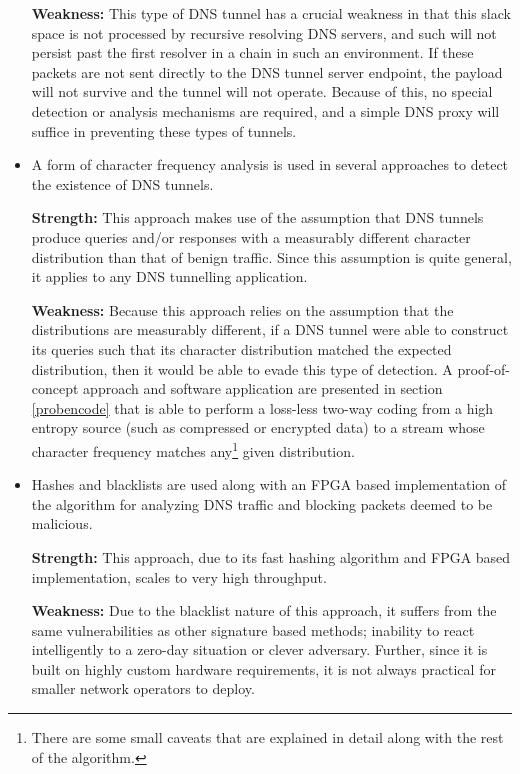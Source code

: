 \documentclass[12pt]{report}
\theoremstyle{remark}
\theoremstyle{definition}
\theoremstyle{definition}
\theoremstyle{definition}
\begin{document}
\begin{itemize}
\textbf{Weakness:} This type of DNS tunnel has a crucial weakness in that this
slack space is not processed by recursive resolving DNS servers, and such will
not persist past the first resolver in a chain in such an environment. If these
packets are not sent directly to the DNS tunnel server endpoint, the payload
will not survive and the tunnel will not operate. Because of this, no special
detection or analysis mechanisms are required, and a simple DNS proxy will
suffice in preventing these types of tunnels.

\item A form of character frequency analysis is used in several approaches to
detect the existence of DNS tunnels.

\textbf{Strength:} This approach makes use of the assumption that DNS tunnels
produce queries and/or responses with a measurably different character
distribution than that of benign traffic. Since this assumption is quite
general, it applies to any DNS tunnelling application.

\textbf{Weakness:} Because this approach relies on the assumption that the
distributions are measurably different, if a DNS tunnel were able to construct
its queries such that its character distribution matched the expected
distribution, then it would be able to evade this type of detection. A
proof-of-concept approach and software application are presented in section
\ref{probencode} that is able to perform a loss-less two-way coding from a high
entropy source (such as compressed or encrypted data) to a stream whose
character frequency matches any\footnote{There are some small caveats that are
explained in detail along with the rest of the algorithm.} given distribution.

\item Hashes and blacklists are used along with an FPGA based implementation of
the algorithm for analyzing DNS traffic and blocking packets deemed to be
malicious.

\textbf{Strength:} This approach, due to its fast hashing algorithm and FPGA
based implementation, scales to very high throughput.

\textbf{Weakness:} Due to the blacklist nature of this approach, it suffers from
the same vulnerabilities as other signature based methods; inability to react
intelligently to a zero-day situation or clever adversary. Further, since it is
built on highly custom hardware requirements, it is not always practical for
smaller network operators to deploy.


\end{itemize}
\end{document}
